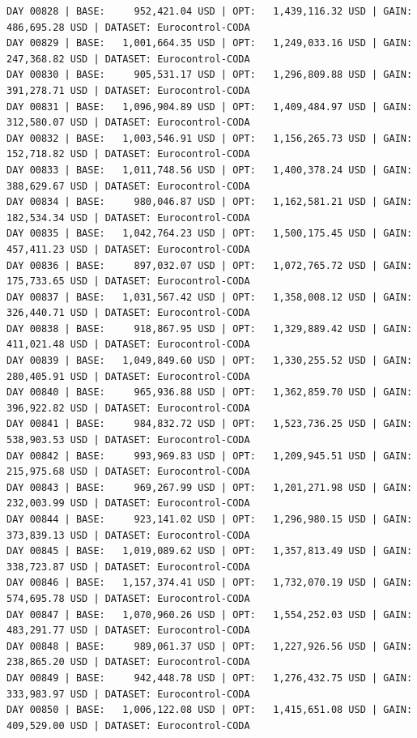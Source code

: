 \documentclass[11pt,a4paper]{article}
\begin{document}
\begin{verbatim}
DAY 00828 | BASE:     952,421.04 USD | OPT:   1,439,116.32 USD | GAIN: 486,695.28 USD | DATASET: Eurocontrol-CODA
DAY 00829 | BASE:   1,001,664.35 USD | OPT:   1,249,033.16 USD | GAIN: 247,368.82 USD | DATASET: Eurocontrol-CODA
DAY 00830 | BASE:     905,531.17 USD | OPT:   1,296,809.88 USD | GAIN: 391,278.71 USD | DATASET: Eurocontrol-CODA
DAY 00831 | BASE:   1,096,904.89 USD | OPT:   1,409,484.97 USD | GAIN: 312,580.07 USD | DATASET: Eurocontrol-CODA
DAY 00832 | BASE:   1,003,546.91 USD | OPT:   1,156,265.73 USD | GAIN: 152,718.82 USD | DATASET: Eurocontrol-CODA
DAY 00833 | BASE:   1,011,748.56 USD | OPT:   1,400,378.24 USD | GAIN: 388,629.67 USD | DATASET: Eurocontrol-CODA
DAY 00834 | BASE:     980,046.87 USD | OPT:   1,162,581.21 USD | GAIN: 182,534.34 USD | DATASET: Eurocontrol-CODA
DAY 00835 | BASE:   1,042,764.23 USD | OPT:   1,500,175.45 USD | GAIN: 457,411.23 USD | DATASET: Eurocontrol-CODA
DAY 00836 | BASE:     897,032.07 USD | OPT:   1,072,765.72 USD | GAIN: 175,733.65 USD | DATASET: Eurocontrol-CODA
DAY 00837 | BASE:   1,031,567.42 USD | OPT:   1,358,008.12 USD | GAIN: 326,440.71 USD | DATASET: Eurocontrol-CODA
DAY 00838 | BASE:     918,867.95 USD | OPT:   1,329,889.42 USD | GAIN: 411,021.48 USD | DATASET: Eurocontrol-CODA
DAY 00839 | BASE:   1,049,849.60 USD | OPT:   1,330,255.52 USD | GAIN: 280,405.91 USD | DATASET: Eurocontrol-CODA
DAY 00840 | BASE:     965,936.88 USD | OPT:   1,362,859.70 USD | GAIN: 396,922.82 USD | DATASET: Eurocontrol-CODA
DAY 00841 | BASE:     984,832.72 USD | OPT:   1,523,736.25 USD | GAIN: 538,903.53 USD | DATASET: Eurocontrol-CODA
DAY 00842 | BASE:     993,969.83 USD | OPT:   1,209,945.51 USD | GAIN: 215,975.68 USD | DATASET: Eurocontrol-CODA
DAY 00843 | BASE:     969,267.99 USD | OPT:   1,201,271.98 USD | GAIN: 232,003.99 USD | DATASET: Eurocontrol-CODA
DAY 00844 | BASE:     923,141.02 USD | OPT:   1,296,980.15 USD | GAIN: 373,839.13 USD | DATASET: Eurocontrol-CODA
DAY 00845 | BASE:   1,019,089.62 USD | OPT:   1,357,813.49 USD | GAIN: 338,723.87 USD | DATASET: Eurocontrol-CODA
DAY 00846 | BASE:   1,157,374.41 USD | OPT:   1,732,070.19 USD | GAIN: 574,695.78 USD | DATASET: Eurocontrol-CODA
DAY 00847 | BASE:   1,070,960.26 USD | OPT:   1,554,252.03 USD | GAIN: 483,291.77 USD | DATASET: Eurocontrol-CODA
DAY 00848 | BASE:     989,061.37 USD | OPT:   1,227,926.56 USD | GAIN: 238,865.20 USD | DATASET: Eurocontrol-CODA
DAY 00849 | BASE:     942,448.78 USD | OPT:   1,276,432.75 USD | GAIN: 333,983.97 USD | DATASET: Eurocontrol-CODA
DAY 00850 | BASE:   1,006,122.08 USD | OPT:   1,415,651.08 USD | GAIN: 409,529.00 USD | DATASET: Eurocontrol-CODA

\end{verbatim}
\end{document}
